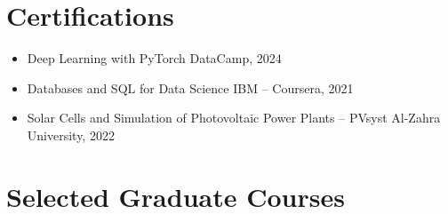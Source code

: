 \documentclass[letter,20pt]{article}
\begin{document}

\section{\textbf{Certifications}}

\vspace{5pt}


\begin{itemize}
[
noitemsep,
topsep=5pt,
leftmargin=3ex
]


\item
Deep Learning with PyTorch
\hfill
DataCamp, 2024


\vspace{4pt}


\item
Databases and SQL for Data Science
\hfill
IBM -- Coursera, 2021


\vspace{4pt}


\item
Solar Cells and Simulation of Photovoltaic Power Plants -- PVsyst
\hfill
Al-Zahra University, 2022


\end{itemize}







\section{\textbf{Selected Graduate Courses}}

\vspace{5pt}
\end{document}
